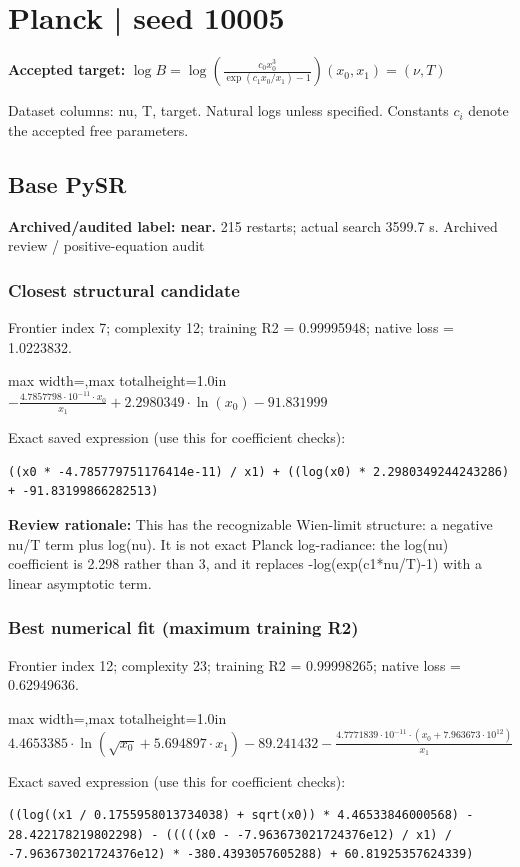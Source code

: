 \documentclass[10pt,letterpaper,landscape]{article}
\begin{document}
\section*{Planck | seed 10005}
\textbf{Accepted target:} $\displaystyle \log B=\log\!\left(\frac{c_0 x_0^3}{\exp(c_1x_0/x_1)-1}\right)$\hfill $(x_0,x_1)=(\nu,T)$\par
{\small Dataset columns: nu, T, target. Natural logs unless specified. Constants $c_i$ denote the accepted free parameters.}\par\medskip
\begin{minipage}[t]{0.485\textwidth}
\subsection*{Base PySR}
\textbf{Archived/audited label: near.} 215 restarts; actual search 3599.7 s.
{\small Archived review / positive-equation audit}
\subsubsection*{Closest structural candidate}
Frontier index 7; complexity 12; training R2 = 0.99995948; native loss = 1.0223832.
\begin{center}\begin{adjustbox}{max width=\linewidth,max totalheight=1.0in}$\displaystyle - \frac{4.7857798 \cdot 10^{-11} \cdot x_{0}}{x_{1}} + 2.2980349 \cdot \ln{\left(x_{0} \right)} - 91.831999$\end{adjustbox}\end{center}
{\scriptsize Exact saved expression (use this for coefficient checks):}
\begin{lstlisting}
((x0 * -4.785779751176414e-11) / x1) + ((log(x0) * 2.2980349244243286) + -91.83199866282513)
\end{lstlisting}
{\small\textbf{Review rationale:} This has the recognizable Wien-limit structure: a negative nu/T term plus log(nu). It is not exact Planck log-radiance: the log(nu) coefficient is 2.298 rather than 3, and it replaces -log(exp(c1*nu/T)-1) with a linear asymptotic term.}
\subsubsection*{Best numerical fit (maximum training R2)}
Frontier index 12; complexity 23; training R2 = 0.99998265; native loss = 0.62949636.
\begin{center}\begin{adjustbox}{max width=\linewidth,max totalheight=1.0in}$\displaystyle 4.4653385 \cdot \ln{\left(\sqrt{x_{0}} + 5.694897 \cdot x_{1} \right)} - 89.241432 - \frac{4.7771839 \cdot 10^{-11} \cdot \left(x_{0} + 7.963673 \cdot 10^{12}\right)}{x_{1}}$\end{adjustbox}\end{center}
{\scriptsize Exact saved expression (use this for coefficient checks):}
\begin{lstlisting}
((log((x1 / 0.1755958013734038) + sqrt(x0)) * 4.46533846000568) - 28.422178219802298) - (((((x0 - -7.963673021724376e12) / x1) / -7.963673021724376e12) * -380.4393057605288) + 60.81925357624339)
\end{lstlisting}
\end{minipage}\hfill
\end{document}
